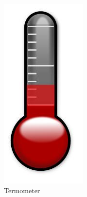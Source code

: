 \begin{figure}[H]
	\centering
	\includegraphics[width=0.2\linewidth]{obrazky/thermometer}
	\caption{Termometer}
	\label{fig:thermometer}
\end{figure}